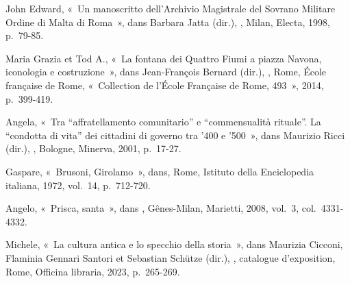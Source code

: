 \begin{teiElement}[name={TEI},change={commons\_edition}]
\begin{teiElement}[name={text},type={book},xmlid={book}]
\begin{teiElement}[name={group},type={book},xmlid={book-001}]
\begin{teiElement}[name={group},type={bibliography},data-page-title={Sources et bibliographie},data-include-href={Ch14\_Source\_bibliographie.xml},xmlid={bibliography-001}]
\begin{teiElement}[name={body}]
\begin{teiDiv}[type={section1},xmlid={div18}]
\begin{teiDiv}[type={section2},xmlid={div19}]
              \begin{teiBibl}[xmlid={bibl-353}]
 John Edward, « Un manoscritto dell’Archivio Magistrale del Sovrano Militare Ordine di Malta di Roma », dans Barbara Jatta (dir.), , Milan, Electa, 1998, p. 79-85.
\end{teiBibl}
              \begin{teiBibl}[xmlid={bibl-354}]
 Maria Grazia et  Tod A., « La fontana dei Quattro Fiumi a piazza Navona, iconologia e costruzione », dans Jean-François Bernard (dir.), , Rome, École française de Rome, « Collection de l’École Française de Rome, 493 », 2014, p. 399-419.
\end{teiBibl}
              \begin{teiBibl}[xmlid={bibl-355}]
 Angela, « Tra “affratellamento comunitario” e “commensualità rituale”. La “condotta di vita” dei cittadini di governo tra ’400 e ’500 », dans Maurizio Ricci (dir.), , Bologne, Minerva, 2001, p. 17-27.
\end{teiBibl}
              \begin{teiBibl}[xmlid={bibl-356}]
 Gaspare, « Brusoni, Girolamo », dans, Rome, Istituto della Enciclopedia italiana, 1972, vol. 14, p. 712-720.
\end{teiBibl}
              \begin{teiBibl}[xmlid={bibl-357}]
 Angelo, « Prisca, santa », dans , Gênes-Milan, Marietti, 2008, vol. 3, col. 4331-4332.
\end{teiBibl}
              \begin{teiBibl}[xmlid={bibl-358}]
 Michele, « La cultura antica e lo specchio della storia », dans Maurizia Cicconi, Flaminia Gennari Santori et Sebastian Schütze (dir.), , catalogue d’exposition, Rome, Officina libraria, 2023, p. 265-269.
\end{teiBibl}
              \begin{teiBibl}[xmlid={bibl-359}]

\end{teiBibl}
\end{teiDiv}
\end{teiDiv}
\end{teiElement}
\end{teiElement}
\end{teiElement}
\end{teiElement}
\end{teiElement}
